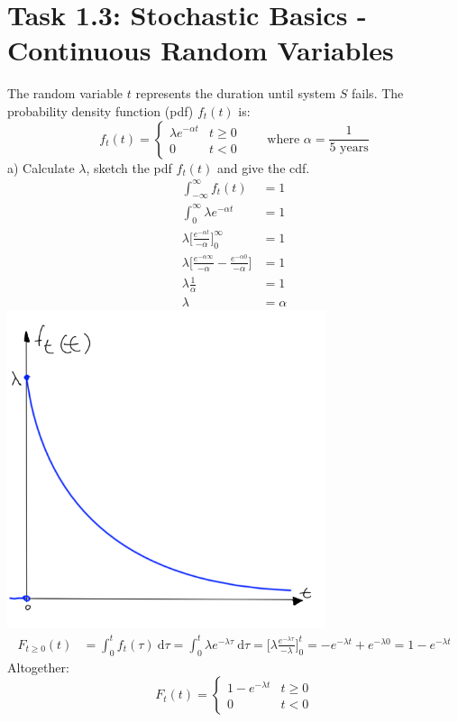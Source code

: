 \documentclass[a4paper,footsepline]{scrartcl}
\begin{document}
	\section*{Task 1.3: Stochastic Basics - Continuous Random Variables}
	The random variable $t$ represents the duration until system $S$ fails. The probability density
	function (pdf) $f_t(t)$ is:
	\[f_t(t) = \begin{cases} 
	\lambda e^{-\alpha t} & t \geq 0\\
	0 & t < 0
	\end{cases} \qquad \text{where } \alpha=\frac{1}{5 \text{ years}} \]
	a) Calculate $\lambda$, sketch the pdf $f_t(t)$ and give the cdf.
	\begin{align*}
		\int_{-\infty}^{\infty} f_t(t) &= 1\\
		\int_{0}^{\infty} \lambda e^{-\alpha t} &= 1\\
		\lambda \Big[ \frac{e^{-\alpha t}}{- \alpha}\Big]_0^\infty &= 1 \\
		\lambda \Big[ \frac{e^{-\alpha \infty}}{- \alpha} - \frac{e^{-\alpha 0}}{- \alpha} \Big] &= 1 \\
		\lambda \frac{1}{\alpha} &= 1 \\
		\lambda &= \alpha
	\end{align*}
	\includegraphics[width=0.7\textwidth]{sketch.png}
	\begin{align*}
	F_{t \geq 0}(t) &= \int_{0}^{t} f_t(\tau)\ \text{d} \tau
	= \int_{0}^{t} \lambda e^{-\lambda \tau}\ \text{d} \tau
	= 	\Big[ \lambda \frac{e^{-\lambda \tau}}{- \lambda}\Big]_0^t
	= - e^{-\lambda t} + e^{-\lambda 0}
	= 1-e^{-\lambda t}
	\end{align*}
	Altogether:
	\[ F_t(t) = \begin{cases} 1-e^{-\lambda t} & t \geq 0\\
	0 & t < 0
	\end{cases} \]
\end{document}
